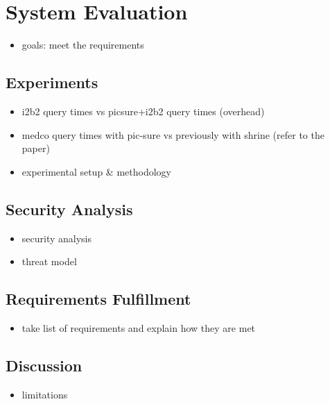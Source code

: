 \chapter{System Evaluation}


\begin{itemize}
    \item goals: meet the requirements
\end{itemize}

\section{Experiments}


\begin{itemize}
    \item i2b2 query times vs picsure+i2b2 query times (overhead)
    \item medco query times with pic-sure vs previously with shrine (refer to the paper)
    \item experimental setup & methodology
\end{itemize}

\section{Security Analysis}
\begin{itemize}
    \item security analysis
    \item threat model
\end{itemize}






\section{Requirements Fulfillment}
\begin{itemize}
    \item take list of requirements and explain how they are met
\end{itemize}

\section{Discussion}
\begin{itemize}
    \item limitations
\end{itemize}

